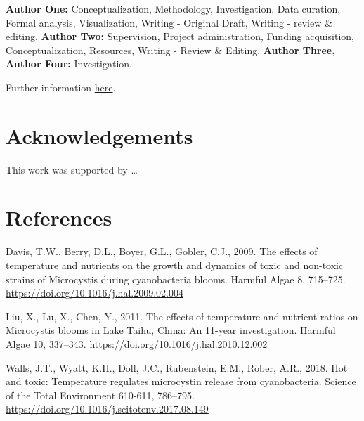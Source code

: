\documentclass[review]{elsarticle} %
\begin{document}
\textbf{Author One:} Conceptualization, Methodology, Investigation, Data
curation, Formal analysis, Visualization, Writing - Original Draft,
Writing - review \& editing. \textbf{Author Two:} Supervision, Project
administration, Funding acquisition, Conceptualization, Resources,
Writing - Review \& Editing. \textbf{Author Three, Author Four:}
Investigation.

Further information
\href{https://www.elsevier.com/authors/policies-and-guidelines/credit-author-statement}{here}.

\section*{Acknowledgements}\label{thanks}

This work was supported by \ldots{}

\newpage

\section*{References}\label{references}

\hypertarget{refs}{}
\hypertarget{ref-Davis2009}{}
Davis, T.W., Berry, D.L., Boyer, G.L., Gobler, C.J., 2009. The effects
of temperature and nutrients on the growth and dynamics of toxic and
non-toxic strains of Microcystis during cyanobacteria blooms. Harmful
Algae 8, 715--725. \url{https://doi.org/10.1016/j.hal.2009.02.004}

\hypertarget{ref-Liu2011a}{}
Liu, X., Lu, X., Chen, Y., 2011. The effects of temperature and nutrient
ratios on Microcystis blooms in Lake Taihu, China: An 11-year
investigation. Harmful Algae 10, 337--343.
\url{https://doi.org/10.1016/j.hal.2010.12.002}

\hypertarget{ref-Walls2018}{}
Walls, J.T., Wyatt, K.H., Doll, J.C., Rubenstein, E.M., Rober, A.R.,
2018. Hot and toxic: Temperature regulates microcystin release from
cyanobacteria. Science of the Total Environment 610-611, 786--795.
\url{https://doi.org/10.1016/j.scitotenv.2017.08.149}

\newpage

\appendix


\renewcommand{\thefigure}{A.\arabic{figure}}

\setcounter{figure}{0} \renewcommand{\thetable}{A.\arabic{table}}
\setcounter{table}{0} \renewcommand{\theequation}{A.\arabic{equation}}
\setcounter{equation}{0}
\end{document}
